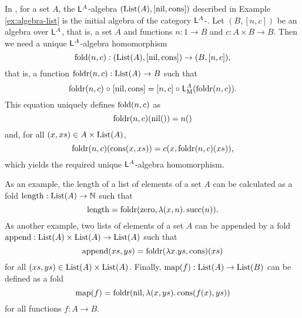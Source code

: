 \begin{example}
  \label{ex:initial-algebra-list}


  In \set, for a set $A$, the $\mathsf{L}^{A}$-algebra
  $(\text{List}(A),[\operatorname{nil},\operatorname{cons}])$ described in Example
  \ref{ex:algebra-list} is the initial algebra of the category
  $\mathsf{L}^{A}$-\alg. Let $(B,[n,c])$ be an algebra over
  $\mathsf{L}^{A}$, that is, a set $A$ and functions $n: 1 \to B$ and
  $c: A \times B \to B$. Then we need a unique $\mathsf{L}^{A}$-algebra
  homomorphism
  \begin{equation*}
    \operatorname{fold}(n,c): (\text{List}(A),[\operatorname{nil},\operatorname{cons}]) \to (B,[n,c])
    \text{,}
  \end{equation*}
  that is, a function $\operatorname{foldr}(n,c): \text{List}(A) \to B$ such that
  \begin{equation*}
    \operatorname{foldr}(n,c) \mathrel{\circ} [\operatorname{nil},\operatorname{cons}] = [n,c] \mathrel{\circ} \mathsf{L}_{\operatorname{M}}^{A}(\operatorname{foldr}(n,c))
    \text{.}
  \end{equation*}
  This equation uniquely defines $\operatorname{fold}(n,c)$ as
  \begin{equation*}
    \operatorname{foldr}(n,c)(\operatorname{nil}()) = n()
  \end{equation*}
  and, for all $(x,xs) \in A \times \text{List}(A)$,
  \begin{equation*}
    \operatorname{foldr}(n,c)(\operatorname{cons}(x,xs)) = c(x,\operatorname{foldr}(n,c)(xs))
    \text{,}
  \end{equation*}
  which yields the required unique $\mathsf{L}^{A}$-algebra
  homomorphism.

  As an example, the length of a list of elements of a set $A$ can be
  calculated as a fold $\operatorname{length}: \text{List}(A) \to \mathbb{N}$ such that
  \begin{equation*}
    \operatorname{length} = \operatorname{foldr}(\operatorname{zero},\lambda(x,n).\operatorname{succ}(n))
    \text{.}
  \end{equation*}
  As another example, two lists of elements of a set $A$ can be
  appended by a fold $\operatorname{append}: \text{List}(A) \times \text{List}(A) \to
  \text{List}(A)$ such that
  \begin{equation*}
    \operatorname{append}(xs,ys) = \operatorname{foldr}(\lambda x.ys,\operatorname{cons})(xs)
  \end{equation*}
  for all $(xs,ys) \in \text{List}(A) \times \text{List}(A)$. Finally,
  $\operatorname{map}(f): \text{List}(A) \to \text{List}(B)$ can be defined as a fold
  \begin{equation*}
    \operatorname{map}(f) = \operatorname{foldr}(\operatorname{nil},\lambda(x,ys).\operatorname{cons}(f(x),ys))
  \end{equation*}
  for all functions $f: A \to B$.

\end{example}

